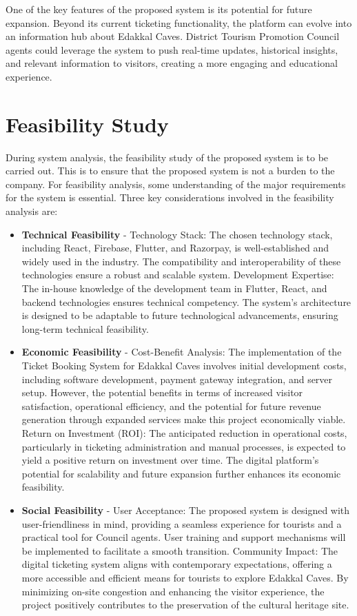 \documentclass[12pt,a4paper]{report}
\begin{document}
One of the key features of the proposed system is its potential for future expansion. Beyond its current ticketing functionality, the platform can evolve into an information hub about Edakkal Caves. District Tourism Promotion Council agents could leverage the system to push real-time updates, historical insights, and relevant information to visitors, creating a more engaging and educational experience.

\section{Feasibility Study}

During system analysis, the feasibility study of the proposed system is to be carried out. This is to ensure that the proposed system is not a burden to the company. For feasibility analysis, some understanding of the major requirements for the system is essential. Three key considerations involved in the feasibility analysis are:
\begin{itemize}
    \item \textbf{Technical Feasibility} - Technology Stack: The chosen technology stack, including React, Firebase, Flutter, and Razorpay, is well-established and widely used in the industry. The compatibility and interoperability of these technologies ensure a robust and scalable system.
          Development Expertise: The in-house knowledge of the development team in Flutter, React, and backend technologies ensures technical competency. The system's architecture is designed to be adaptable to future technological advancements, ensuring long-term technical feasibility.
    \item \textbf{Economic Feasibility} - Cost-Benefit Analysis: The implementation of the Ticket Booking System for Edakkal Caves involves initial development costs, including software development, payment gateway integration, and server setup. However, the potential benefits in terms of increased visitor satisfaction, operational efficiency, and the potential for future revenue generation through expanded services make this project economically viable.
          Return on Investment (ROI): The anticipated reduction in operational costs, particularly in ticketing administration and manual processes, is expected to yield a positive return on investment over time. The digital platform's potential for scalability and future expansion further enhances its economic feasibility.
    \item \textbf{Social Feasibility} - User Acceptance: The proposed system is designed with user-friendliness in mind, providing a seamless experience for tourists and a practical tool for Council agents. User training and support mechanisms will be implemented to facilitate a smooth transition.
          Community Impact: The digital ticketing system aligns with contemporary expectations, offering a more accessible and efficient means for tourists to explore Edakkal Caves. By minimizing on-site congestion and enhancing the visitor experience, the project positively contributes to the preservation of the cultural heritage site.
\end{itemize}
\end{document}
